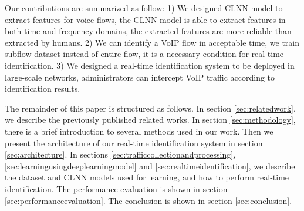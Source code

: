 \documentclass[conference]{IEEEtran}
\begin{document}
Our contributions are summarized as follow: 1) We designed CLNN model to extract features for voice flows, the CLNN model is able to extract features in both time and frequency domains, the extracted features are more reliable than extracted by humans. 2) We can identify a VoIP flow in acceptable time, we train subflow dataset instead of entire flow, it is a necessary condition for real-time identification. 3) We designed a real-time identification system to be deployed in large-scale networks, administrators can intercept VoIP traffic according to identification results.

The remainder of this paper is structured as follows. In section \ref{sec:relatedwork}, we describe the previously published related works.  In section \ref{sec:methodology}, there is a brief introduction to several methods used in our work. Then we present the architecture of our real-time identification system in section \ref{sec:architecture}. In sections \ref{sec:trafficcollectionandprocessing}, \ref{sec:learningusingdeeplearningmodel} and \ref{sec:realtimeidentification}, we describe the dataset and CLNN models used for learning, and how to perform real-time identification. The performance evaluation is shown in section \ref{sec:performanceevaluation}. The conclusion is shown in section \ref{sec:conclusion}.





\end{document}
